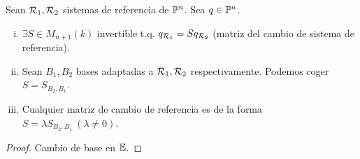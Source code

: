 \begin{prop}
    Sean $\mathcal{R}_1, \mathcal{R}_2$ sistemas de referencia de $\mathbb{P}^n$. Sea $q \in \mathbb{P}^n$.
    \begin{enumerate}[i)]
        \item $\exists S \in M_{n+1}(k)$ invertible t.q. $q_{\mathcal{R}_1} = S q_{\mathcal{R}_2}$
        (matriz del cambio de sistema de referencia).
        \item Sean $B_1, B_2$ bases adaptadas a $\mathcal{R}_1, \mathcal{R}_2$ respectivamente. Podemos coger $S=S_{B_2, B_1}$.
        \item Cualquier matriz de cambio de referencia es de la forma $S=\lambda S_{B_2, B_1} \ (\lambda \neq 0)$.
    \end{enumerate}
\end{prop}
\begin{proof}
    Cambio de base en $\mathbb{E}$.
\end{proof}
